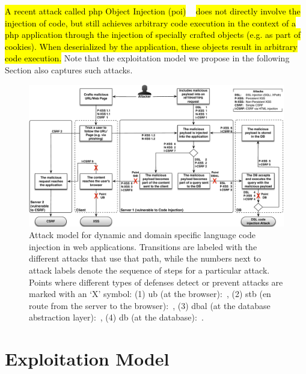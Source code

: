 \documentclass[10pt,journal,compsoc]{IEEEtran}
\newcommand{\hlc}[2][yellow]{ {\sethlcolor{#1} \hl{#2}} }
\begin{document}
\hlc[yellow]{A recent attack called {\sc php} Object Injection
({\sc poi})}~\cite{DKH14} \hlc[yellow]{does not directly involve
the injection of code, but still achieves arbitrary code execution
in the context of a {\sc php} application through the
injection of specially crafted objects
(e.g. as part of cookies).
When deserialized
by the application, these objects result in
arbitrary code execution.}
Note that the exploitation model we propose
in the following Section also captures such attacks.

\begin{figure}[t]
\begin{center}
\leavevmode
\includegraphics[scale=0.46]{attacks-steps-CSRF.pdf}
\end{center}
\vspace{-5.5mm}
\caption{\label{fig:attacks}Attack model for dynamic and domain specific
language code injection in web applications.
Transitions are labeled with the different attacks that use that path,
while the numbers next to attack labels denote the 
sequence of steps for a particular attack.
Points where different types of defenses
detect or prevent attacks are marked with an `X' symbol:
(1) {\sc ub} (at the browser):~\cite{KJKV09,LV09,TNH07,NSS06,APKLM10,ML10,YCIS07,
PSC09,VDDPJ11,OWVS08,DDHPJ10,VFJKKV07,SLMS14,BV08,SSM10,HBBS14,SYMRHKM14,BCJPST15,GLSTMMR12},
(2) {\sc s}t{\sc b} (en route from the server to the browser):~\cite{RDWDE07,JKK06a,GC09,JB07,NLC07,WPLKK09,JEP08,PS11},
(3) {\sc dbal} (at the database abstraction layer):~\cite{BWS05,SW06,HCF05,XBS06,PB05,PMP11,MS09,HO05b,SMS13},
(4) {\sc db} (at the database):~\cite{BK04,LLW02,VMV05,CVMA07,GLSTMMR12,CPSPBCCSL12}.}
\vspace{-6mm}
\end{figure}

\section{Exploitation Model}
\label{sec:model}
\end{document}
